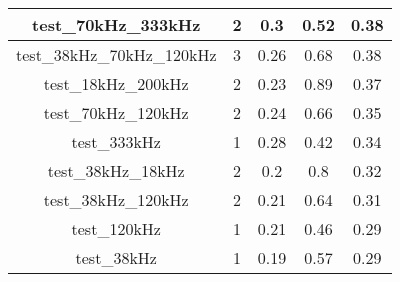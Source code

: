 \begin{longtable}{|c|c|c|c|c|}
test\_70kHz\_333kHz                               & 2                                                                                              & 0.3                                     & 0.52                                 & 0.38                                    \\ \hline
test\_38kHz\_70kHz\_120kHz                        & 3                                                                                              & 0.26                                    & 0.68                                 & 0.38                                    \\ \hline
test\_18kHz\_200kHz                               & 2                                                                                              & 0.23                                    & 0.89                                 & 0.37                                    \\ \hline
test\_70kHz\_120kHz                               & 2                                                                                              & 0.24                                    & 0.66                                 & 0.35                                    \\ \hline
test\_333kHz                                      & 1                                                                                              & 0.28                                    & 0.42                                 & 0.34                                    \\ \hline
test\_38kHz\_18kHz                                & 2                                                                                              & 0.2                                     & 0.8                                  & 0.32                                    \\ \hline
test\_38kHz\_120kHz                               & 2                                                                                              & 0.21                                    & 0.64                                 & 0.31                                    \\ \hline
test\_120kHz                                      & 1                                                                                              & 0.21                                    & 0.46                                 & 0.29                                    \\ \hline
test\_38kHz                                       & 1                                                                                              & 0.19                                    & 0.57                                 & 0.29                                    \\ \hline

\end{longtable}
